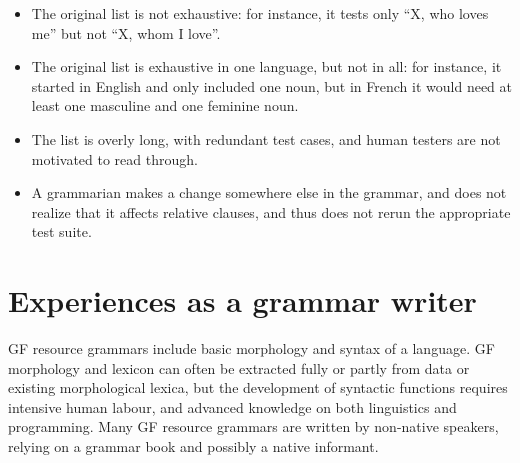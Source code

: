 \documentclass[11pt]{article}
\begin{document}
\begin{itemize}
\item The original list is not exhaustive: for instance, it tests only
``X, who loves me'' but not ``X, whom I love''. 
\item The original list is exhaustive in one language, but not in all:
for instance, it started in English and only included one noun, but in
French it would need at least one masculine and one feminine noun. 
\item The list is overly long, with redundant test cases, and human
testers are not motivated to read through. 
\item A grammarian makes a change somewhere else in the grammar, and
does not realize that it affects relative clauses, and thus does not
rerun the appropriate test suite. 
\end{itemize}


\section{Experiences as a grammar writer}


GF resource grammars include basic morphology and syntax of a
language. GF morphology and lexicon can often be extracted fully or
partly from data or existing morphological lexica, but the development
of syntactic functions requires intensive human labour, and advanced
knowledge on both linguistics and programming. 
Many GF resource grammars are written by non-native speakers, relying
on a grammar book and possibly a native informant. 




\end{document}
